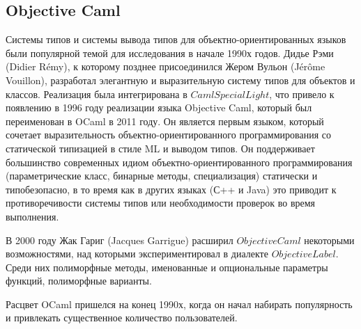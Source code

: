 \documentclass[14pt]{matmex-diploma-custom}
\begin{document}
\subsection{Objective Caml}
Системы типов и системы вывода типов для объектно-ориентированных языков были популярной темой для исследования в начале 1990х годов. Дидье Рэми (Didier Rémy), к которому позднее присоединился Жером Вульон (Jérôme Vouillon), разработал элегантную и выразительную систему типов для объектов и классов. Реализация была интегрирована в $Caml Special Light$, что привело к появлению в 1996 году реализации языка Objective Caml, который был переименован в OCaml в 2011 году. Он является первым языком, который сочетает выразительность объектно-ориентированного программирования со статической типизацией в стиле ML и выводом типов.  Он поддерживает большинство современных идиом объектно-ориентированного программирования (параметрические класс, бинарные методы, специализация) статически и типобезопасно, в то время как в других языках (С++ и Java) это приводит к противоречивости системы типов или необходимости проверок во время выполнения.

В 2000 году Жак Гариг (Jacques Garrigue) расширил $Objective Caml$ некоторыми возможностями, над которыми экспериментировал в диалекте $Objective Label$. Среди них полиморфные методы, именованные и опциональные параметры функций, полиморфные варианты.

Расцвет OCaml пришелся на конец 1990х, когда он начал набирать популярность и привлекать существенное количество пользователей.
\end{document}
